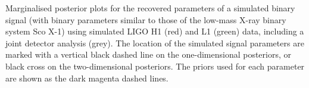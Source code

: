 \label{fig:scox1_inj}
Marginalised posterior plots for the recovered parameters of a simulated binary signal (with binary parameters
similar to those of the low-mass X-ray binary system Sco X-1) using simulated LIGO H1 (red) and L1 (green) data, including a joint detector analysis
(grey). The location of the simulated signal parameters are marked with a vertical black dashed line on the one-dimensional posteriors, or black
cross on the two-dimensional posteriors. The priors used for each parameter are shown as the dark magenta dashed lines.
